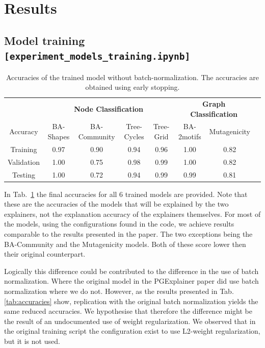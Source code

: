\section{Results}\label{sec:results}

\subsection{Model training \hfill \texttt{[experiment\_models\_training.ipynb]}}
\begin{table}[]
\centering
\begin{tabular}{cccccccc}
\toprule
&\multicolumn{4}{c}{\textbf{Node Classification}} & \multicolumn{2}{c}{\textbf{Graph Classification}} \\
Accuracy & \multicolumn{1}{c}{BA-Shapes} & \multicolumn{1}{c}{BA-Community} & \multicolumn{1}{c}{Tree-Cycles} & \multicolumn{1}{c|}{Tree-Grid} & \multicolumn{1}{c}{BA-2motifs} & \multicolumn{1}{c}{Mutagenicity} \\ 
\midrule
Training & 0.97 & 0.90 & 0.94 & \multicolumn{1}{c|}{0.96} & 1.00 & 0.82 \\
Validation & 1.00 & 0.75 & 0.98 & \multicolumn{1}{c|}{0.99} & 1.00 & 0.82 \\
Testing & 1.00 & 0.72 & 0.94 & \multicolumn{1}{c|}{0.99} & 0.99 & 0.81 \\
\bottomrule
\end{tabular}
\caption{Accuracies of the trained model without batch-normalization. The accuracies are obtained using early stopping. }
\label{tab:simp_accs}
\end{table}
In Tab.~\ref{tab:simp_accs} the final accuracies for all 6 trained models are provided. Note that these are the accuracies of the models that will be explained by the two explainers, not the explanation accuracy of the explainers themselves. For most of the models, using the configurations found in the code, we achieve results comparable to the results presented in the paper. The two exceptions being the BA-Community and the Mutagenicity models. Both of these score lower then their original counterpart. 

Logically this difference could be contributed to the difference in the use of batch normalization. Where the original model in the PGExplainer paper did use batch normalization where we do not. However, as the results presented in Tab.\,\ref{tab:accuracies} show, replication with the original batch normalization yields the same reduced accuracies. We hypothesise that therefore the difference might be the result of an undocumented use of weight regularization. We observed that in the original training script the configuration exist to use L2-weight regularization, but it is not used.

